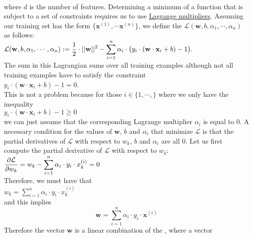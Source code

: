 \\[0.2cm]
where $d$ is the number of features.
Determining a minimum of a function that is subject to a set of constraints requires us to use 
\href{https://en.wikipedia.org/wiki/Lagrange_multiplier}{Lagrange multipliers}.  Assuming our training set 
has the form $\{ \mathbf{x}^{(1)}, \cdots \mathbf{x}^{(n)} \}$,
we define the  $\mathcal{L}(\mathbf{w}, b, \alpha_1, \cdots, \alpha_n)$ as follows:
\\[0.2cm]
\hspace*{1.3cm}
$\displaystyle \mathcal{L}(\mathbf{w}, b, \alpha_1, \cdots, \alpha_n) := 
 \frac{1}{2} \cdot ||\mathbf{w}||^2 - 
\sum\limits_{i=1}^n \alpha_i \cdot \bigl(y_i \cdot(\mathbf{w} \cdot \mathbf{x}_i + b) - 1\bigr).
$ 
\\[0.2cm]
The sum in this Lagrangian sums over all training examples although not all training examples have to satisfy
the constraint
\\[0.2cm]
\hspace*{1.3cm}
$y_i \cdot(\mathbf{w} \cdot \mathbf{x}_i + b) - 1 = 0$.
\\[0.2cm]
This is not a problem because for those $i \in \{1,\cdots,\}$ where we only have the inequality
\\[0.2cm]
\hspace*{1.3cm}
$y_i \cdot(\mathbf{w} \cdot \mathbf{x}_i + b) - 1 \geq 0$
\\[0.2cm]
we can just assume that the corresponding Lagrange multiplier $\alpha_i$ is  equal to $0$.
A necessary condition for the values of $\mathbf{w}$, $b$ and $\alpha_i$ that minimize $\mathcal{L}$ is that
the partial derivatives of $\mathcal{L}$ with respect to $w_k$, $b$ and $\alpha_i$ are all $0$.  Let us first compute the partial derivative of $\mathcal{L}$
with respect to $w_k$:
\\[0.2cm]
\hspace*{1.3cm}
$\displaystyle \frac{\partial \mathcal{L}}{\partial w_k} = 
 w_k - \sum\limits_{i=1}^n \alpha_i \cdot y_i \cdot x^{(i)}_k = 0
$
\\[0.2cm]
Therefore, we must have that
\\[0.2cm]
\hspace*{1.3cm}
$w_k = \sum\limits_{i=1}^n \alpha_i \cdot y_i \cdot x^{(i)}_k $ 
\\[0.2cm]
and this implies
\begin{equation}
  \label{eq:svm-9}
  \mathbf{w} = \sum\limits_{i=1}^n \alpha_i \cdot y_i \cdot \mathbf{x}^{(i)}
\end{equation}
Therefore the vector $\mathbf{w}$ is a linear combination of the , where a vector
